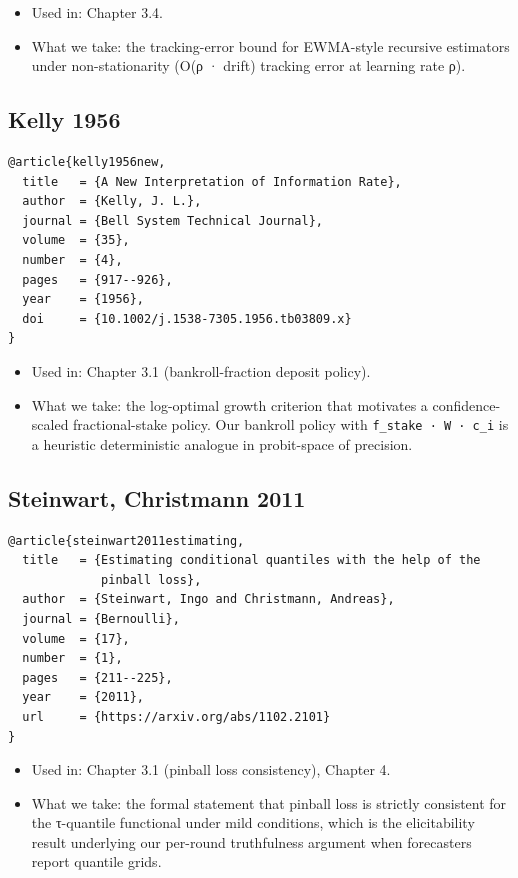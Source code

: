 \documentclass[11pt,a4paper,openany]{report}
\begin{document}
\begin{itemize}
  \item Used in: Chapter 3.4.
  \item What we take: the tracking-error bound for EWMA-style recursive
    estimators under non-stationarity (O(ρ · drift) tracking error at
    learning rate ρ).
\end{itemize}

\subsection{Kelly 1956}

\begin{verbatim}
@article{kelly1956new,
  title   = {A New Interpretation of Information Rate},
  author  = {Kelly, J. L.},
  journal = {Bell System Technical Journal},
  volume  = {35},
  number  = {4},
  pages   = {917--926},
  year    = {1956},
  doi     = {10.1002/j.1538-7305.1956.tb03809.x}
}
\end{verbatim}

\begin{itemize}
  \item Used in: Chapter 3.1 (bankroll-fraction deposit policy).
  \item What we take: the log-optimal growth criterion that motivates a
    confidence-scaled fractional-stake policy. Our bankroll policy with
    \texttt{f\_stake · W · c\_i} is a heuristic deterministic analogue in
    probit-space of precision.
\end{itemize}

\subsection{Steinwart, Christmann 2011}

\begin{verbatim}
@article{steinwart2011estimating,
  title   = {Estimating conditional quantiles with the help of the
             pinball loss},
  author  = {Steinwart, Ingo and Christmann, Andreas},
  journal = {Bernoulli},
  volume  = {17},
  number  = {1},
  pages   = {211--225},
  year    = {2011},
  url     = {https://arxiv.org/abs/1102.2101}
}
\end{verbatim}

\begin{itemize}
  \item Used in: Chapter 3.1 (pinball loss consistency), Chapter 4.
  \item What we take: the formal statement that pinball loss is strictly
    consistent for the τ-quantile functional under mild conditions,
    which is the elicitability result underlying our per-round
    truthfulness argument when forecasters report quantile grids.
\end{itemize}
\end{document}
